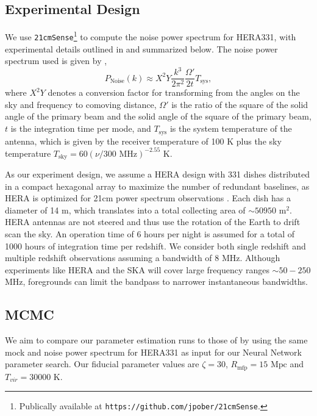 \documentclass[useAMS,usenatbib]{mnras}
\begin{document}
\subsection{Experimental Design}
We use \texttt{21cmSense}\footnote{Publically available at \texttt{https://github.com/jpober/21cmSense}.}  \citep{Pober2013,Pober2014} to compute the noise power spectrum for HERA331, with experimental details outlined in \citet{Beardsley2015} and summarized below.
The noise power spectrum used is given by \citep{Parsons2012},  
\begin{equation}
P_\text{Noise}(k) \approx X^2Y \frac{k^3}{2\pi^2}\frac{\Omega'}{2t} T_\text{sys},
\end{equation}
where $X^2Y$ denotes a conversion factor for transforming from the angles on the sky and frequency to comoving distance, $\Omega'$ is the ratio of the square of the solid angle of the primary beam and the solid angle of the square of the primary beam, $t$ is the integration time per mode, and $T_\text{sys}$ is the system temperature of the antenna, which is given by the receiver temperature of  100 K  plus the sky temperature $T_\text{sky} = 60 \left(\nu / 300 \text{ MHz}\right)^{-2.55}\text{ K}$.

As our experiment design, we assume a HERA design with 331 dishes distributed in a compact hexagonal array to maximize the number of redundant baselines, as HERA is optimized for 21cm power spectrum observations \citep{DeBoer2017,Liu2016}. 
Each dish has a diameter of 14 m, which translates into a total collecting area of $\sim 50950 \text{ m}^2$.
HERA antennas are not steered and thus use the rotation of the Earth to drift scan the sky.
An operation time of 6 hours per night is assumed for a total of 1000 hours of integration time per redshift. 
We consider both single redshift and multiple redshift observations assuming a bandwidth of 8 MHz. 
Although experiments like HERA and the SKA will cover large frequency ranges $\sim 50-250$MHz, foregrounds can limit the bandpass to narrower instantaneous bandwidths. 


\subsection{MCMC}

We aim to compare our parameter estimation runs to those of \citet{greig2015} by using the same mock and noise power spectrum for HERA331 as input for our Neural Network parameter search.
Our fiducial parameter values are $\zeta = 30$, $R_\text{mfp} = 15 \text{ Mpc}$ and $T_{vir} = 30000\text{ K}$.
\end{document}
